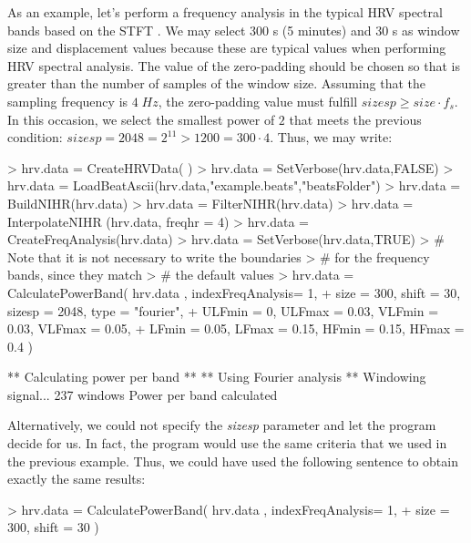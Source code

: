 \documentclass[12pt,lot, lof]{puthesis}
\begin{document}
As an example, let's perform a frequency analysis in the typical \gls{HRV} 
spectral bands based on the \gls{STFT} . We may select 300 s (5 minutes) and 30 
s as window size and  displacement
values because these are typical values when performing \gls{HRV} spectral 
analysis. The value of the zero-padding should be chosen so that is greater 
than the number of samples of the window size. Assuming that the sampling 
frequency is $4\;Hz$, the zero-padding value must fulfill $sizesp \geq 
size\cdot f_s$. In this occasion, we select the smallest power of $2$ that 
meets the previous condition: $sizesp = 2048 = 2^{11} > 1200 = 300\cdot4$. 
Thus, we may write:
\begin{Schunk}
\begin{Sinput}
> hrv.data = CreateHRVData( )
> hrv.data = SetVerbose(hrv.data,FALSE)
> hrv.data = LoadBeatAscii(hrv.data,"example.beats","beatsFolder")
> hrv.data = BuildNIHR(hrv.data)
> hrv.data = FilterNIHR(hrv.data)
> hrv.data = InterpolateNIHR (hrv.data, freqhr = 4)
> hrv.data = CreateFreqAnalysis(hrv.data)
> hrv.data = SetVerbose(hrv.data,TRUE)
> # Note that it is not necessary to write the boundaries 
> # for the frequency bands, since they match
> # the default values
> hrv.data = CalculatePowerBand( hrv.data , indexFreqAnalysis= 1,
+ size = 300, shift = 30, sizesp = 2048, type = "fourier",
+ ULFmin = 0, ULFmax = 0.03, VLFmin = 0.03, VLFmax = 0.05,
+  LFmin = 0.05, LFmax = 0.15, HFmin = 0.15,   HFmax = 0.4 )
\end{Sinput}
\begin{Soutput}
** Calculating power per band **
** Using Fourier analysis **
   Windowing signal... 237 windows 
Power per band calculated
\end{Soutput}
\end{Schunk}
Alternatively, we could not specify the \textit{sizesp} parameter and let the 
program decide for us. In fact, the program would use the same criteria that we 
used
in the previous example. Thus, we could have used the following sentence to 
obtain exactly the same results:
\begin{Schunk}
\begin{Sinput}
> hrv.data = CalculatePowerBand( hrv.data , indexFreqAnalysis= 1,
+ size = 300, shift = 30 )
\end{Sinput}
\end{Schunk}
\end{document}
